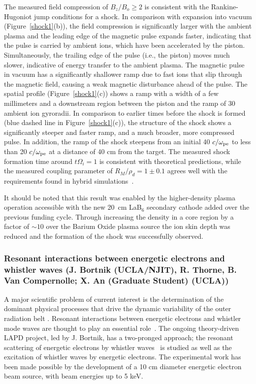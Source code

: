 \documentclass[11pt]{article}
\renewcommand{\cite}{\citep}
\begin{document}
The
measured field compression of $B_z/B_o \ge 2$ is consistent
with the Rankine-Hugoniot jump conditions for a shock. In comparison
with expansion into vacuum (Figure~\ref{shock1}(b)), the field compression is
significantly larger with the ambient plasma and the leading edge of the
magnetic pulse expands faster, indicating that the pulse is carried by
ambient ions, which have been accelerated by the piston. Simultaneously,
the trailing edge of the pulse (i.e., the piston) moves much slower,
indicative of energy transfer to the ambient plasma. The magnetic pulse
in vacuum has a significantly shallower ramp due to fast ions that slip
through the magnetic field, causing a weak magnetic disturbance ahead of
the pulse. The spatial profile (Figure~\ref{shock1}(c)) shows a ramp with a width of
a few millimeters and a downstream region between the piston and the
ramp of 30 ambient ion gyroradii. In comparison to earlier times before
the shock is formed (blue dashed line in Figure~\ref{shock1}(c)), the structure of
the shock shows a significantly steeper and faster ramp, and a much
broader, more compressed pulse. In addition, the ramp of the shock
steepens from an initial 40 $c/\omega_{\rm pe}$ to less
than 20 $c/\omega_{\rm pe}$ at a distance of 40 cm from
the target. The measured shock formation time around
$t \Omega_{i} = 1$ is consistent with theoretical
predictions, while the measured coupling parameter of
$R_M/\rho_d = 1 \pm 0.1$ agrees
well with the requirements found in hybrid simulations~\cite{clark:2014}.


It should be noted that this result was enabled by the higher-density
plasma operation accessible with the new 20~cm LaB$_6$ secondary
cathode added over the previous funding cycle.  Through increasing the
density in a core region by a factor of $\sim 10$ over the Barium
Oxide plasma source the ion skin depth was reduced and the formation
of the shock was successfully observed.

\subsubsection{Resonant interactions between energetic electrons and whistler
waves (J. Bortnik (UCLA/NJIT), R. Thorne, B. Van Compernolle; X. An (Graduate
Student) (UCLA))}

A major scientific problem of current interest is the determination of
the dominant physical processes that drive the dynamic variability of
the outer radiation belt \cite{thorne:2010, reeves:2013}. Resonant interactions between
energetic electrons and whistler mode waves are thought to play an
essential role~\cite{horne:2005, thorne:2013}. The ongoing theory-driven
LAPD project, led by J. Bortnik, has a two-pronged approach; the
resonant scattering of energetic electrons by whistler waves~\cite{vancompernolle:2014} is studied as well as the excitation of
whistler waves by energetic electrons. The experimental work has been
made possible by the development of a 10 cm diameter energetic electron
beam source, with beam energies up to 5 keV.
\end{document}
